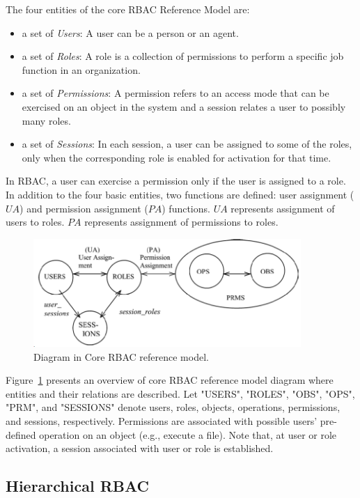 The four entities of the core RBAC Reference Model are:

\begin{itemize}
\setlength{\itemsep}{0.25pt}
\item a set of \emph{Users}: A user can be a person or an agent.
\item a set of \emph{Roles}: A role is a collection of permissions to perform a specific job function in an organization.
\item a set of \emph{Permissions}: A permission refers to an access mode that can be exercised on an object in the system and a session relates a user to possibly many roles.
\item a set of \emph{Sessions}: In each session, a user can be assigned to some of the roles, only when the corresponding role is enabled for activation for that time.		
\end{itemize}

In RBAC, a user can exercise a permission only if the user is assigned to a role.
In addition to the four basic entities, two functions are defined:
user assignment ($UA$) and permission assignment ($PA$) functions.
$UA$ represents assignment of users to roles.
$PA$ represents assignment of permissions to roles.

\begin{figure}[ht]
    \centering
        \includegraphics[width=4.0in]{sections/core-model.png}
    \caption{\label{fig:overview}Diagram in Core RBAC reference model\cite{ferraiolokuhn}.}
\end{figure}

Figure~\ref{fig:overview} presents an overview of core RBAC reference model diagram where entities and their relations are described.
Let "USERS", "ROLES", "OBS", "OPS", "PRM", and "SESSIONS" denote users, roles, objects, operations, permissions, and sessions, respectively.
Permissions are associated with possible users' pre-defined operation on an object (e.g., execute a file).
Note that, at user or role activation, a session associated with user or role is established.

\subsection{Hierarchical RBAC} 

